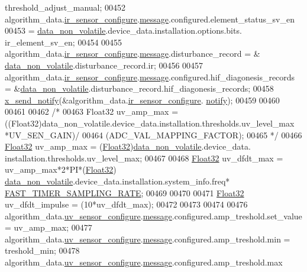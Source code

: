 \begin{DoxyCode}
{{{{{      threshold\_adjust\_manual;
00452     algorithm\_data.\hyperlink{a00016_ac6483a3473f539f671660ae458d889d3}{ir\_sensor\_configure}.\hyperlink{a00018_a32952acc732e2f16aad59fe0804da5bf}{message}.configured.element\_status\_sv\_en
00453                    = \hyperlink{a00060_a76ac5f917f5308dcd83de0d7c94559fb}{data\_non\_volatile}.device\_data.installation.options.bits.
      ir\_element\_sv\_en;
00454 
00455     algorithm\_data.\hyperlink{a00016_ac6483a3473f539f671660ae458d889d3}{ir\_sensor\_configure}.\hyperlink{a00018_a32952acc732e2f16aad59fe0804da5bf}{message}.disturbance\_record = &
      \hyperlink{a00060_a76ac5f917f5308dcd83de0d7c94559fb}{data\_non\_volatile}.disturbance\_record.ir;
00456 
00457     algorithm\_data.\hyperlink{a00016_ac6483a3473f539f671660ae458d889d3}{ir\_sensor\_configure}.\hyperlink{a00018_a32952acc732e2f16aad59fe0804da5bf}{message}.configured.hif\_diagonesis\_records 
      = &\hyperlink{a00060_a76ac5f917f5308dcd83de0d7c94559fb}{data\_non\_volatile}.disturbance\_record.hif\_diagonesis\_records;
00458     \hyperlink{a00036_ae17b0bb16da3c471bb6074bb4c4d0fee}{x\_send\_notify}(&algorithm\_data.\hyperlink{a00016_ac6483a3473f539f671660ae458d889d3}{ir\_sensor\_configure}.
      \hyperlink{a00018_a8e6a04c2283f9fd7b8dcbc62faba5847}{notify});
00459 
00460 
00461 
00462     \textcolor{comment}{/*}
00463 \textcolor{comment}{     Float32 uv\_amp\_max      = ((Float32)data\_non\_volatile.device\_data.installation.thresholds.uv\_level\_max
       *UV\_SEN\_GAIN)/}
00464 \textcolor{comment}{                                   (ADC\_VAL\_MAPPING\_FACTOR);}
00465 \textcolor{comment}{    */}
00466      \hyperlink{a00072_a87d38f886e617ced2698fc55afa07637}{Float32} uv\_amp\_max      = (\hyperlink{a00072_a87d38f886e617ced2698fc55afa07637}{Float32})\hyperlink{a00060_a76ac5f917f5308dcd83de0d7c94559fb}{data\_non\_volatile}.device\_data.
      installation.thresholds.uv\_level\_max;
00467  
00468      \hyperlink{a00072_a87d38f886e617ced2698fc55afa07637}{Float32} uv\_dfdt\_max     = uv\_amp\_max*2*PI*(\hyperlink{a00072_a87d38f886e617ced2698fc55afa07637}{Float32})
      \hyperlink{a00060_a76ac5f917f5308dcd83de0d7c94559fb}{data\_non\_volatile}.device\_data.installation.system\_info.freq*
      \hyperlink{a00021_a3a4dcb8af26a561d90607a41a3745806}{FAST\_TIMER\_SAMPLING\_RATE};
00469 
00470 
00471      \hyperlink{a00072_a87d38f886e617ced2698fc55afa07637}{Float32} uv\_dfdt\_impulse = (10*uv\_dfdt\_max);
00472 
00473 
00474 
00476     algorithm\_data.\hyperlink{a00016_af1ff980a38b896c99e86279a3c67f00d}{uv\_sensor\_configure}.\hyperlink{a00018_a32952acc732e2f16aad59fe0804da5bf}{message}.configured.amp\_treshold.set\_value 
         = uv\_amp\_max;
00477     algorithm\_data.\hyperlink{a00016_af1ff980a38b896c99e86279a3c67f00d}{uv\_sensor\_configure}.\hyperlink{a00018_a32952acc732e2f16aad59fe0804da5bf}{message}.configured.amp\_treshold.min       
         = treshold\_min;
00478     algorithm\_data.\hyperlink{a00016_af1ff980a38b896c99e86279a3c67f00d}{uv\_sensor\_configure}.\hyperlink{a00018_a32952acc732e2f16aad59fe0804da5bf}{message}.configured.amp\_treshold.max       
         
}}}}}
\end{DoxyCode}
